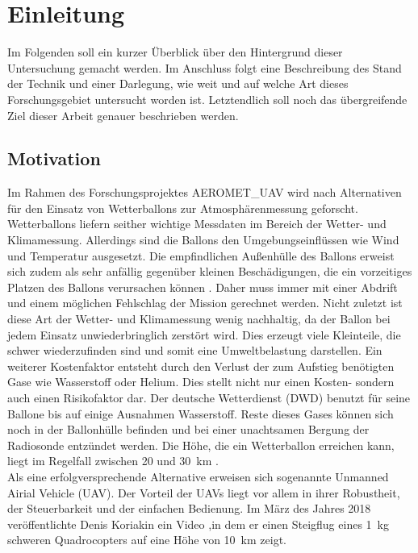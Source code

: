 \chapter{Einleitung}
\label{chap:Einleitung}
Im Folgenden soll ein kurzer Überblick über den Hintergrund dieser Untersuchung gemacht werden. Im Anschluss folgt eine Beschreibung des Stand der Technik und einer Darlegung, wie weit und auf welche Art dieses Forschungsgebiet untersucht worden ist. Letztendlich soll noch das übergreifende Ziel dieser Arbeit genauer beschrieben werden.


\section{Motivation}
\label{sec:motivation}
Im Rahmen des Forschungsprojektes AEROMET\_UAV wird nach Alternativen für den Einsatz von Wetterballons zur Atmosphärenmessung geforscht. Wetterballons liefern seither wichtige Messdaten im Bereich der Wetter- und Klimamessung. Allerdings sind die Ballons den Umgebungseinflüssen wie Wind und Temperatur ausgesetzt. Die empfindlichen Außenhülle des Ballons erweist sich zudem als sehr anfällig gegenüber kleinen Beschädigungen, die ein vorzeitiges Platzen des Ballons verursachen können \cite{dwd}. Daher muss immer mit einer Abdrift und einem möglichen Fehlschlag der Mission gerechnet werden. Nicht zuletzt ist diese Art der Wetter- und Klimamessung wenig nachhaltig, da der Ballon bei jedem Einsatz unwiederbringlich zerstört wird. Dies erzeugt viele Kleinteile, die schwer wiederzufinden sind und somit eine Umweltbelastung darstellen. Ein weiterer Kostenfaktor entsteht durch den Verlust der zum Aufstieg benötigten Gase wie Wasserstoff oder Helium. Dies stellt nicht nur einen Kosten- sondern auch einen Risikofaktor dar. Der deutsche Wetterdienst (DWD) benutzt für seine Ballone bis auf einige Ausnahmen Wasserstoff. Reste dieses Gases können sich noch in der Ballonhülle befinden und bei einer unachtsamen Bergung der Radiosonde entzündet werden.
Die Höhe, die ein Wetterballon erreichen kann, liegt im Regelfall zwischen \SI{20}{} und \SI{30}{km} \cite{dwd}. \\ 
Als eine erfolgversprechende Alternative erweisen sich sogenannte Unmanned Airial Vehicle (UAV). Der Vorteil der UAVs liegt vor allem in ihrer Robustheit, der Steuerbarkeit und der einfachen Bedienung. Im März des Jahres 2018 veröffentlichte Denis Koriakin ein Video \cite{Anderson.2018},in dem er einen Steigflug eines \SI{1}{kg} schweren Quadrocopters auf eine Höhe von \SI{10}{km} zeigt. 


